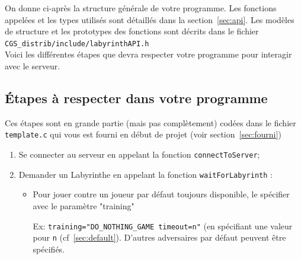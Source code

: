 \documentclass[french,12pt,a4paper,twoside,openright,titlepage]{report}
\begin{document}
On donne ci-après la structure générale de votre programme. Les fonctions appelées et les types utilisés sont détaillés
dans la section~\ref{sec:api}.  Les modèles de structure et les prototypes des fonctions sont décrits dans le fichier 
\verb|CGS_distrib/include/labyrinthAPI.h|\\
Voici les différentes étapes que devra respecter votre programme pour interagir avec le serveur.

\subsection{Étapes à respecter dans votre programme}
\label{sec:sequences}
Ces étapes sont en grande partie (mais pas complètement) codées dans le fichier \verb|template.c| qui vous est fourni en début de projet (voir section~\ref{sec:fourni})
\begin{enumerate}
\item Se connecter au serveur en appelant la fonction \verb|connectToServer|;
\item Demander un Labyrinthe en appelant la fonction \verb|waitForLabyrinth| :
\begin{itemize}
\item Pour jouer contre un joueur par défaut toujours disponible, le spécifier avec le paramètre "training"

Ex: \texttt{training="DO\_NOTHING\_GAME timeout=n"} (en spécifiant une valeur pour \verb|n| (cf~\ref{sec:default}). D'autres adversaires par défaut peuvent être spécifiés. 


\end{itemize}
\end{enumerate}
\end{document}
